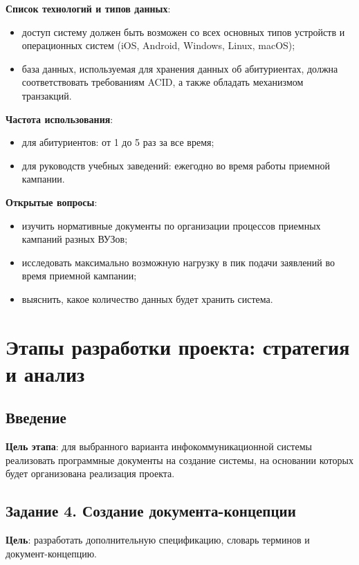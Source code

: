 \documentclass[a4paper, 14pt]{extarticle}
\begin{document}
{  \textbf{Список технологий и типов данных}:
  \begin{itemize}
    \item доступ систему должен быть возможен со всех основных типов устройств и
    операционных систем (iOS, Android, Windows, Linux, macOS);
    \item база данных, используемая для хранения данных об абитуриентах, должна
    соответствовать требованиям ACID, а также обладать механизмом транзакций.
  \end{itemize}

  \textbf{Частота использования}:
  \begin{itemize}
    \item для абитуриентов: от 1 до 5 раз за все время;
    \item для руководств учебных заведений: ежегодно во время работы приемной
    кампании.
  \end{itemize}

  \textbf{Открытые вопросы}:
  \begin{itemize}
    \item изучить нормативные документы по организации процессов приемных
    кампаний разных ВУЗов;
    \item исследовать максимально возможную нагрузку в пик подачи заявлений во
    время приемной кампании;
    \item выяснить, какое количество данных будет хранить система.
  \end{itemize}
}

\section{Этапы разработки проекта: стратегия и анализ}

\subsection*{Введение}

\textbf{Цель этапа}: для выбранного варианта инфокоммуникационной системы
реализовать программные документы на создание системы, на основании которых
будет организована реализация проекта.

\subsection*{Задание 4. Создание документа-концепции}

\textbf{Цель}: разработать дополнительную спецификацию, словарь терминов и
документ-концепцию.
\end{document}
